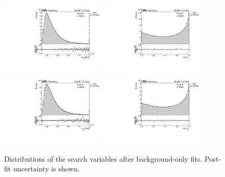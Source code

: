\begin{figure}
  \centering
  \includegraphics[width=0.45\textwidth]{fig/chapt7/stat/MassTT_mu_postfit.pdf}
  \includegraphics[width=0.45\textwidth]{fig/chapt7/stat/CosTopLepTT_mu_postfit.pdf} \\
  \includegraphics[width=0.45\textwidth]{fig/chapt7/stat/MassTT_e_postfit.pdf}
  \includegraphics[width=0.45\textwidth]{fig/chapt7/stat/CosTopLepTT_e_postfit.pdf}
  \caption{Distributions of the search variables after background-only fits. Post-fit uncertainty is shown.}
  \label{Fig:DataMCPostFit}
\end{figure}

